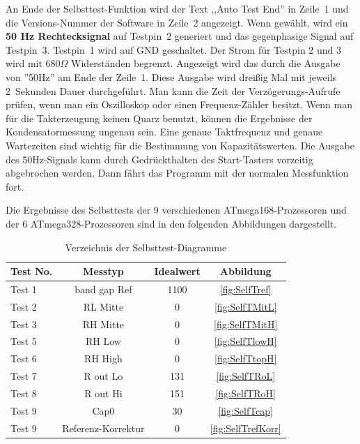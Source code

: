 An Ende der Selbsttest-Funktion wird der Text ,,Auto Test End'' in Zeile~1 und die Versions-Nummer der Software in Zeile~2 angezeigt.
Wenn gewählt, wird ein {\bf 50 Hz Rechtecksignal} auf Testpin~2 generiert und das gegenphasige Signal auf Testpin~3.
Testpin~1 wird auf GND geschaltet. Der Strom für Testpin 2 und 3 wird mit \(680\Omega\) Widerständen begrenzt.
Angezeigt wird das durch die Ausgabe von ''50Hz'' am Ende der Zeile~1.
Diese Ausgabe wird dreißig Mal mit jeweils 2~Sekunden Dauer durchgeführt.
Man kann die Zeit der Verzögerungs-Aufrufe prüfen, wenn man ein Oszilloskop oder einen
Frequenz-Zähler besitzt.
Wenn man für die Takterzeugung keinen Quarz benutzt, können die
Ergebnisse der Kondensatormessung ungenau sein.
Eine genaue Taktfrequenz und genaue Wartezeiten sind wichtig für die Bestimmung von Kapazitätswerten.
Die Ausgabe des 50Hz-Signals kann durch Gedrückthalten des Start-Tasters vorzeitig abgebrochen werden.
Dann fährt das Programm mit der normalen Messfunktion fort.


Die Ergebnisse des Selbsttests der 9 verschiedenen ATmega168-Prozessoren und der 6 ATmega328-Prozessoren
sind in den folgenden Abbildungen dargestellt. 

\begin{table}[H]
  \begin{center}
    \begin{tabular}{| l | c | c | c |}
    \hline
Test No. &  Messtyp    & Idealwert & Abbildung \\
    \hline
    \hline
Test 1 & band gap Ref  & 1100 & \ref{fig:SelfTref} \\
    \hline
Test 2 & RL Mitte & 0 & \ref{fig:SelfTMitL} \\
    \hline
Test 3 & RH Mitte & 0 & \ref{fig:SelfTMitH} \\
    \hline
Test 5 & RH Low &  0 & \ref{fig:SelfTlowH} \\
    \hline
Test 6 & RH High & 0 & \ref{fig:SelfTtopH} \\
    \hline
Test 7 & R out Lo & 131 & \ref{fig:SelfTRoL} \\
    \hline
Test 8 & R out Hi & 151 & \ref{fig:SelfTRoH} \\
    \hline
Test 9 & Cap0  & 30 & \ref{fig:SelfTcap} \\
    \hline
Test 9 & Referenz-Korrektur  & 0 & \ref{fig:SelfTrefKorr} \\
    \hline
    \end{tabular}
  \end{center}
  \caption{Verzeichnis der Selbsttest-Diagramme}
  \label{tab:test_m168} 
\end{table}

